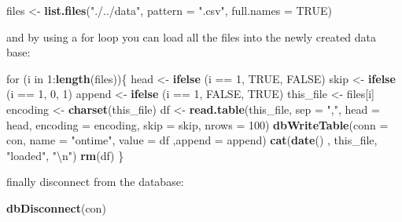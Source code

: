 \documentclass[]{book}
\newenvironment{Shaded}{\begin{snugshade}}{\end{snugshade}}
\newcommand{\KeywordTok}[1]{\textcolor[rgb]{0.13,0.29,0.53}{\textbf{{#1}}}}
\newcommand{\DataTypeTok}[1]{\textcolor[rgb]{0.13,0.29,0.53}{{#1}}}
\newcommand{\DecValTok}[1]{\textcolor[rgb]{0.00,0.00,0.81}{{#1}}}
\newcommand{\CharTok}[1]{\textcolor[rgb]{0.31,0.60,0.02}{{#1}}}
\newcommand{\StringTok}[1]{\textcolor[rgb]{0.31,0.60,0.02}{{#1}}}
\newcommand{\OtherTok}[1]{\textcolor[rgb]{0.56,0.35,0.01}{{#1}}}
\newcommand{\NormalTok}[1]{{#1}}
\begin{document}
\begin{Shaded}
\begin{Highlighting}[]
\NormalTok{files <-}\StringTok{ }\KeywordTok{list.files}\NormalTok{(}\StringTok{"./../data"}\NormalTok{, }\DataTypeTok{pattern =} \StringTok{".csv"}\NormalTok{, }\DataTypeTok{full.names =} \OtherTok{TRUE}\NormalTok{)}
\end{Highlighting}
\end{Shaded}

and by using a for loop you can load all the files into the newly
created data base:

\begin{Shaded}
\begin{Highlighting}[]
\NormalTok{for (i in }\DecValTok{1}\NormalTok{:}\KeywordTok{length}\NormalTok{(files))\{}
  \NormalTok{head <-}\StringTok{ }\KeywordTok{ifelse} \NormalTok{(i ==}\StringTok{ }\DecValTok{1}\NormalTok{, }\OtherTok{TRUE}\NormalTok{, }\OtherTok{FALSE}\NormalTok{)}
  \NormalTok{skip <-}\StringTok{ }\KeywordTok{ifelse} \NormalTok{(i ==}\StringTok{ }\DecValTok{1}\NormalTok{, }\DecValTok{0}\NormalTok{, }\DecValTok{1}\NormalTok{)}
  \NormalTok{append <-}\StringTok{ }\KeywordTok{ifelse} \NormalTok{(i ==}\StringTok{ }\DecValTok{1}\NormalTok{, }\OtherTok{FALSE}\NormalTok{, }\OtherTok{TRUE}\NormalTok{)}
  \NormalTok{this_file <-}\StringTok{ }\NormalTok{files[i]}
  \NormalTok{encoding <-}\StringTok{ }\KeywordTok{charset}\NormalTok{(this_file)}
  \NormalTok{df <-}\StringTok{ }\KeywordTok{read.table}\NormalTok{(this_file, }\DataTypeTok{sep =} \StringTok{","}\NormalTok{, }\DataTypeTok{head =} \NormalTok{head, }\DataTypeTok{encoding =} \NormalTok{encoding, }\DataTypeTok{skip =} \NormalTok{skip, }\DataTypeTok{nrows =} \DecValTok{100}\NormalTok{)}
  \KeywordTok{dbWriteTable}\NormalTok{(}\DataTypeTok{conn =} \NormalTok{con, }\DataTypeTok{name =} \StringTok{"ontime"}\NormalTok{, }\DataTypeTok{value =} \NormalTok{df ,}\DataTypeTok{append =} \NormalTok{append)}
  \KeywordTok{cat}\NormalTok{(}\KeywordTok{date}\NormalTok{() , this_file, }\StringTok{"loaded"}\NormalTok{, }\StringTok{"}\CharTok{\textbackslash{}n}\StringTok{"}\NormalTok{)}
  \KeywordTok{rm}\NormalTok{(df)}
\NormalTok{\}  }
\end{Highlighting}
\end{Shaded}

finally disconnect from the database:

\begin{Shaded}
\begin{Highlighting}[]
\KeywordTok{dbDisconnect}\NormalTok{(con)}
\end{Highlighting}
\end{Shaded}
\end{document}
